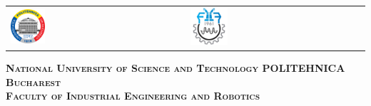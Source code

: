 



\begin{titlepage}
	\centering
	\begin{tabular}{p{6cm}p{3.2cm}}
		\includegraphics[width=0.2\textwidth]{img/upb.png} &
		\includegraphics[width=0.22\textwidth]{img/fiir.png}
	\end{tabular}
	\vspace{1cm}

	{\scshape\Large \textbf{National University of Science and Technology POLITEHNICA Bucharest} \\}
	{\scshape\Large \textbf{Faculty of Industrial Engineering and Robotics} \\}
	
\end{titlepage}

